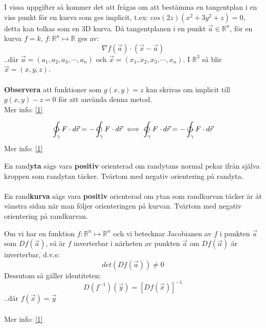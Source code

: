 \documentclass{report}
\begin{document}
{
	I vissa uppgifter så kommer det att frågas om att bestämma en tangentplan i en viss punkt för en kurva som ges implicit, t.ex: $ cos(2z)(x^2+3y^2+z) = 0 $, detta kan tolkas som en 3D kurva. Då tangentplanen i en punkt $\vec{a} \in \mathbb{R}^n $, för en kurva $f = k$, $f : \mathbb{R}^n \mapsto \mathbb{R} $ ges av:
	\begin{equation*}
		\nabla 	f(\vec{a}) \cdot (\vec{x} - \vec{a})
	\end{equation*}
	..där $\vec{a} = (a_1, a_2, a_3, \cdots, a_n)$ och $\vec{x} = (x_1, x_2, x_3, \cdots, x_n)$. I $\mathbb{R}^3$ så blir $\vec{x} = (x,y,z) $.\\\\
	
	\textbf{Observera} att funktioner som $g(x,y) = z$ kan skrivas om implicit till $g(x,y) - z = 0$ för att använda denna metod.\\
	Mer info: \href{https://math.stackexchange.com/a/2084635}{[1]}
}

{
	\begin{equation*}
		\ointctrclockwise_{\gamma} F \cdot d\vec{r} = -\ointclockwise_{\gamma} F \cdot d\vec{r} \iff \ointclockwise_{\gamma} F \cdot d\vec{r} = -\ointctrclockwise_{\gamma} F \cdot d\vec{r}
	\end{equation*}
	Mer info: \href{https://en.wikipedia.org/wiki/Vector_calculus_identities}{[1]}
}

{
	En rand\textbf{yta} sägs vara \textbf{positiv} orienterad om randytans normal pekar ifrån själva kroppen som randytan täcker. Tvärtom med negativ orientering på randyta.\\\\
	
	En rand\textbf{kurva} sägs vara \textbf{positiv} orienterad om ytan som randkurvan täcker är åt vänstra sidan när man följer orienteringen på kurvan. Tvärtom med negativ orientering på randkurvan.
}


{
	Om vi har en funktion $f : \mathbb{R}^n \mapsto \mathbb{R}^n$ och vi betecknar Jacobianen av $f$ i punkten $\vec{a}$ som $Df(\vec{a})$, så är $f$ inverterbar i närheten av punkten $\vec{a}$ om $Df(\vec{a})$ är inverterbar, d.v.s:
	\begin{equation*}
		det(Df(\vec{a})) \ne 0
	\end{equation*}
	Dessutom så gäller identiteten:
	\begin{equation*}
		D(f^{-1})(\vec{y}) = [Df(\vec{x})]^{-1}
	\end{equation*}
	..där $ f(\vec{x}) = \vec{y} $\\\\
	
	Mer info: \href{http://www.math.toronto.edu/courses/mat237y1/20189/notes/Chapter3/S3.3.html}{[1]}
}
\end{document}
